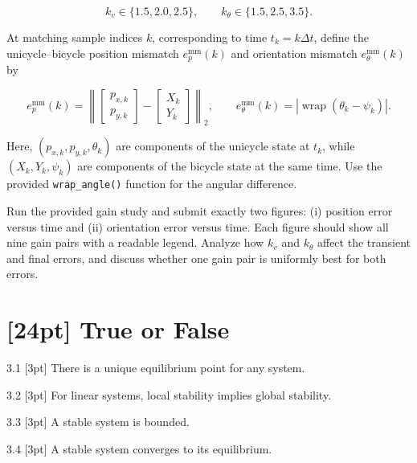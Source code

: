 \begin{equation}
k_v\in\{1.5,2.0,2.5\},
\qquad
k_\theta\in\{1.5,2.5,3.5\}.
\end{equation}

At matching sample indices $k$, corresponding to time $t_k=k\Delta t$, define
the unicycle--bicycle position mismatch $e_p^{\mathrm{mm}}(k)$ and orientation
mismatch $e_\theta^{\mathrm{mm}}(k)$ by

\begin{equation}
e_p^{\mathrm{mm}}(k)=\left\|
\begin{bmatrix}p_{x,k}\\p_{y,k}\end{bmatrix}
-
\begin{bmatrix}X_k\\Y_k\end{bmatrix}
\right\|_2,
\qquad
e_\theta^{\mathrm{mm}}(k)=
\left|\operatorname{wrap}(\theta_k-\psi_k)\right|.
\end{equation}

Here, $(p_{x,k},p_{y,k},\theta_k)$ are components of the unicycle state at
$t_k$, while $(X_k,Y_k,\psi_k)$ are components of the bicycle state at the
same time. Use the provided \texttt{wrap\_angle()} function for the angular
difference.

Run the provided gain study and submit exactly two figures: (i) position error
versus time and (ii) orientation error versus time. Each figure should show all
nine gain pairs with a readable legend. Analyze how $k_v$ and $k_\theta$ affect
the transient and final errors, and discuss whether one gain pair is uniformly
best for both errors.

\solution{}

\section{[24pt] True or False}

3.1 [3pt] There is a unique equilibrium point for any system.

\solution{}

3.2 [3pt] For linear systems, local stability implies global stability.

\solution{}

3.3 [3pt] A stable system is bounded.

\solution{}

3.4 [3pt] A stable system converges to its equilibrium.

